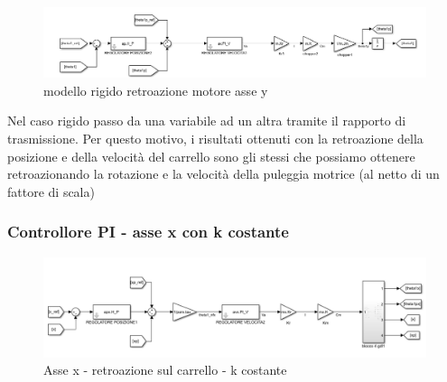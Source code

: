 \documentclass{article}
\begin{document}
\begin{figure}[H]
\centering
\includegraphics[width=.8\textwidth]{./simulink/ldm_rigido/PIDrigmoty.png}
\caption{modello rigido retroazione motore asse y}
\end{figure}

Nel caso rigido passo da una variabile ad un altra tramite il rapporto di trasmissione. Per questo motivo, i risultati ottenuti con la retroazione della posizione e della velocità del carrello sono gli stessi che possiamo ottenere retroazionando la rotazione e la velocità della puleggia motrice (al netto di un fattore di scala)

\subsubsection{Controllore PI - asse x con k costante}

\begin{figure}[H]
\centering
\includegraphics[width=.8\textwidth]{./simulink/ldm_variabile/PIDX_RCARRELLO}
\caption{Asse x - retroazione sul carrello - k costante}
\end{figure}
\end{document}
